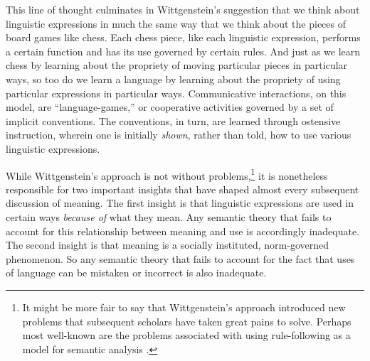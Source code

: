 This line of thought culminates in Wittgenstein's suggestion that we think about linguistic expressions in much the same way that we think about the pieces of board games like chess. Each chess piece, like each linguistic expression, performs a certain function and has its use governed by certain rules. And just as we learn chess by learning about the propriety of moving particular pieces in particular ways, so too do we learn a language by learning about the propriety of using particular expressions in particular ways. Communicative interactions, on this model, are ``language-games,'' or cooperative activities governed by a set of implicit conventions. The conventions, in turn, are learned through ostensive instruction, wherein one is initially \textit{shown}, rather than told, how to use various linguistic expressions. 

While Wittgenstein's approach is not without problems,\footnote{It might be more fair to say that Wittgenstein's approach introduced new problems that subsequent scholars have taken great pains to solve. Perhaps most well-known are the problems associated with using rule-following as a model for semantic analysis \citep[see][]{Brandom:1994,Kripke:1982}.} it is nonetheless responsible for two important insights that have shaped almost every subsequent discussion of meaning. The first insight is that linguistic expressions are used in certain ways \textit{because of} what they mean. Any semantic theory that fails to account for this relationship between meaning and use is accordingly inadequate. The second insight is that meaning is a socially instituted, norm-governed phenomenon. So any semantic theory that fails to account for the fact that uses of language can be mistaken or incorrect is also inadequate.

